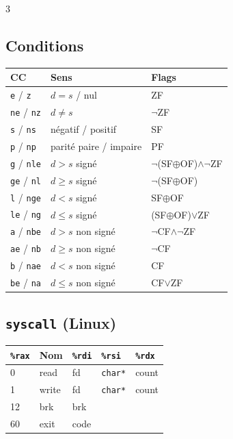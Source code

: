 \documentclass[12pt, a4paper]{article}
\begin{document}
\begin{multicols*}{3}
	\subsection{Conditions}
	\begin{tabular}{|l|l|l|}
		\hline
		\textbf{CC}               & \textbf{Sens}          & \textbf{Flags}                      \\
		\hline
		\texttt{e} / \texttt{z}   & $d = s$ / nul          & ZF                                  \\
		\texttt{ne} / \texttt{nz} & $d \neq s$             & $\lnot$ZF                           \\
		\texttt{s} / \texttt{ns}  & négatif / positif      & SF                                  \\
		\texttt{p} / \texttt{np}  & parité paire / impaire & PF                                  \\
		\hline
		\texttt{g} / \texttt{nle} & $d > s$ signé          & $\lnot$(SF$\oplus$OF)$\land\lnot$ZF \\
		\texttt{ge} / \texttt{nl} & $d \geq s$ signé       & $\lnot$(SF$\oplus$OF)               \\
		\texttt{l} / \texttt{nge} & $d < s$ signé          & SF$\oplus$OF                        \\
		\texttt{le} / \texttt{ng} & $d \leq s$ signé       & (SF$\oplus$OF)$\lor$ZF              \\
		\hline
		\texttt{a} / \texttt{nbe} & $d > s$ non signé      & $\lnot$CF$\land\lnot$ZF             \\
		\texttt{ae} / \texttt{nb} & $d \geq s$ non signé   & $\lnot$CF                           \\
		\texttt{b} / \texttt{nae} & $d < s$ non signé      & CF                                  \\
		\texttt{be} / \texttt{na} & $d \leq s$ non signé   & CF$\lor$ZF                          \\
		\hline
	\end{tabular}


	\subsection{\lstinline|syscall| (Linux)}

	\begin{tabular}{|l|l|l|l|l|}
		\hline
		\texttt{\%rax} & \textbf{Nom} & \texttt{\%rdi} & \texttt{\%rsi} & \texttt{\%rdx} \\
		\hline
		0              & read         & fd             & \texttt{char*} & count          \\
		1              & write        & fd             & \texttt{char*} & count          \\
		12             & brk          & brk            &                &                \\
		60             & exit         & code           &                &                \\
		\hline
	\end{tabular}


\end{multicols*}
\end{document}
